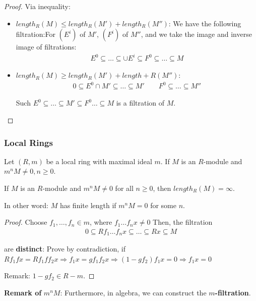 \documentclass[Total.tex]{subfiles}
\begin{document}
		\begin{proof}
			Via inequality:
			\begin{itemize}
				\item $length_R(M)\leq length_R(M')+length_R(M'')$: We have the following filtration:For $(E^i)$ of $M'$, $(F^i)$ of $M''$, and we take the image and inverse image of filtrations:
				\begin{gather*}
					E^0\subseteq \dots\subseteq \cup E^i\subseteq F^0\subseteq\dots\subseteq  M 
				\end{gather*}
				\item $length_R(M)\geq length_R(M')+length+R(M'')$: 
				\begin{gather*}
					0\subseteq E^0\cap M'\subseteq \dots\subseteq M'\qquad  F^0\subseteq \dots\subseteq M''
				\end{gather*}
				
				Such $E^0\subseteq \dots\subseteq M'\subseteq F^0 \dots\subseteq M$ is a filtration of $M$. 
			\end{itemize}
		\end{proof}
		
		\subsubsection{Local Rings}
		
		\begin{lemma}
			Let $(R,m)$ be a local ring with maximal ideal $m$. If $M$ is an $R$-module and $m^nM\not=0,n\geq 0$. 
			
			If $M$ is an $R$-module and $m^n M\not=0$ for all $n\geq 0$, then $length_R(M)=\infty$.
			
			In other word: $M$ has finite length if $m^n M=0$ for some $n$. 
		\end{lemma}
		\begin{proof}
			Choose $f_1,\dots,f_n\in m$, where $f_1\dots f_n x\not=0$ Then, the filtration
			\begin{gather*}
				0\subseteq Rf_1\dots f_n x\subseteq \dots \subseteq Rx\subseteq M
			\end{gather*}
			
			are \textbf{distinct}: Prove by contradiction, if $Rf_1fx=Rf_1ff_2x\Rightarrow f_1x=gf_1f_2x\Rightarrow (1-gf_2)f_1x=0\Rightarrow f_1x=0$
			
			Remark: $1-gf_2\in R-m$.
		\end{proof}
		
		\textbf{Remark of} $m^n M$: Furthermore, in algebra, we can construct the \textbf{$m$-filtration}. 
\end{document}
